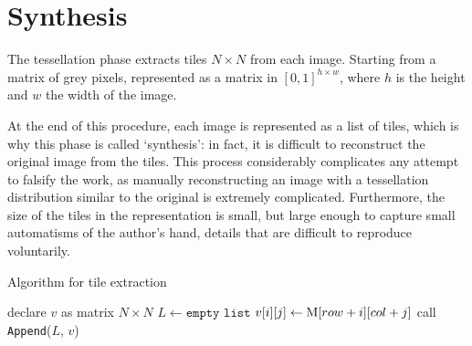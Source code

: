\section{Synthesis}
The tessellation phase extracts tiles $N\times N$ from each image. Starting from a matrix of grey pixels, represented as a matrix in $\left[0,1\right]^{h \times w}$, where $h$ is the height and $w$ the width of the image.

\noindent At the end of this procedure, each image is represented as a list of tiles, which is why this phase is called ‘synthesis’: in fact, it is difficult to reconstruct the original image from the tiles. This process considerably complicates any attempt to falsify the work, as manually reconstructing an image with a tessellation distribution similar to the original is extremely complicated. Furthermore, the size of the tiles in the representation is small, but large enough to capture small automatisms of the author's hand, details that are difficult to reproduce voluntarily.

\begin{algorithm}[ht]
\caption{Algorithm for tile extraction}
\begin{algorithmic}[1]
    \State declare $v$ as matrix $N \times N$ 
    \State $L \gets \texttt{empty list}$ 
            \State $v[i][j] \gets \textnormal{M}[row + i][col + j]$
        \EndFor
        \State call \texttt{Append}($L$, $v$)
    \EndFor
\EndFunction
\label{alg:SequentialTilesExtraction}
\end{algorithmic}
\end{algorithm}

